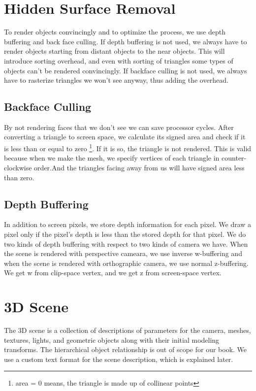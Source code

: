 \section{Hidden Surface Removal}
To render objects convincingly and to optimize the process, we use depth buffering and back face culling. If depth buffering is not used, we always have to render objects starting from distant objects to the near objects. This will introduce sorting overhead, and even with sorting of triangles some types of objects can't be rendered convincingly. If backface culling is not used, we always have to rasterize triangles we won't see anyway, thus adding the overhead.
\subsection{Backface Culling}
By not rendering faces that we don't see we can save processor cycles.
After converting a triangle to screen space, we calculate its signed area and check if it is less than or equal to zero \footnote{area = 0 means, the triangle is made up of collinear points}. If it is so, the triangle is not rendered. This is valid because when we make the mesh, we specify vertices of each triangle in counter-clockwise order.And the triangles facing away from us will have signed area less than zero.
\subsection{Depth Buffering}
In addition to screen pixels, we store depth information for each pixel.
We draw a pixel only if the pixel's depth is less than the stored depth for that pixel. We do two kinds of depth buffering with respect to two kinds of camera we have. When the scene is rendered with perspective cameara, we use inverse w-buffering and when the scene is rendered with orthographic camera, we use normal z-buffering.
We get w from clip-space vertex, and we get z from screen-space vertex. 

\section{3D Scene}
The 3D scene is a collection of descriptions of parameters for the camera, meshes, textures, lights, and geometric objects along with their initial modeling transforms. The hierarchical object relationship is out of scope for our book. We use a custom text format for the scene description, which is explained later. 

